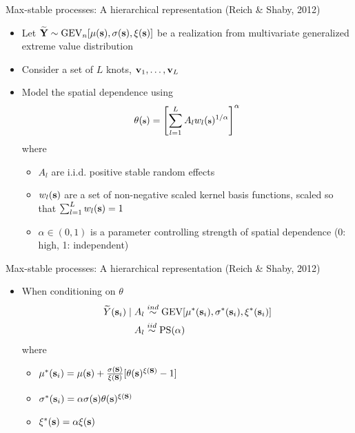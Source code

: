 \documentclass{beamer}
\begin{document}
\begin{frame}{Max-stable processes: A hierarchical representation (Reich \& Shaby, 2012)}
\begin{itemize} \setlength{\itemsep}{1em}
  \item Let $\widetilde{\mbox{\bf Y}} \sim \text{GEV}_n[\mu(\mbox{\bf s}), \sigma(\mbox{\bf s}), \xi(\mbox{\bf s})]$ be a realization from multivariate generalized extreme value distribution
  \item Consider a set of $L$ knots, $\mbox{\bf v}_1, \ldots, \mbox{\bf v}_L$
  \item Model the spatial dependence using
  \begin{align*}
    \footnotesize
    \theta(\mbox{\bf s}) = \left[\sum_{l = 1}^L A_l w_l(\mbox{\bf s})^{1 / \alpha}\right]^\alpha
  \end{align*}
  where
  \begin{itemize} \setlength{\itemsep}{0.5em}
    \item $A_l$ are i.i.d. positive stable random effects
    \item $w_l(\mbox{\bf s})$ are a set of non-negative scaled kernel basis functions, scaled so that $\sum_{l = 1}^L w_l(\mbox{\bf s}) = 1$
    \item $\alpha \in (0, 1)$ is a parameter controlling strength of spatial dependence (0: high, 1: independent)
  \end{itemize}
\end{itemize}
\end{frame}

\begin{frame}{Max-stable processes: A hierarchical representation (Reich \& Shaby, 2012)}
\begin{itemize} \setlength{\itemsep}{1em}
  \item When conditioning on $\theta$
  \begin{align*}
    \widetilde{Y}(\mbox{\bf s}_i) \mid A_l &\stackrel{ind}{\sim} \text{GEV}[\mu^*(\mbox{\bf s}_i), \sigma^*(\mbox{\bf s}_i), \xi^*(\mbox{\bf s}_i)] \\
    A_l &\stackrel{iid}{\sim} \text{PS}(\alpha)
  \end{align*}
  where
  \begin{itemize} \setlength{\itemsep}{0.5em}
    \item $\mu^*(\mbox{\bf s}_i) = \mu(\mbox{\bf s}) + \frac{\sigma(\mbox{\bf s})}{\xi(\mbox{\bf s})}[\theta(\mbox{\bf s})^{\xi(\mbox{\bf s})} - 1]$
    \item $\sigma^*(\mbox{\bf s}_i) = \alpha \sigma(\mbox{\bf s}) \theta(\mbox{\bf s})^{\xi(\mbox{\bf s})}$
    \item $\xi^*(\mbox{\bf s}) = \alpha \xi(\mbox{\bf s})$
  \end{itemize}
\end{itemize}
\end{frame}
\end{document}
